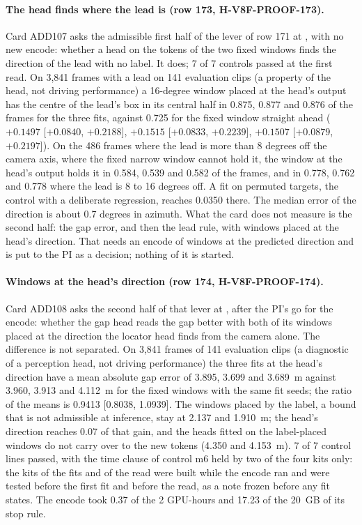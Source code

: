 \paragraph{The head finds where the lead is (row 173, H-V8F-PROOF-173).} Card ADD107 asks the admissible first half of the lever of row 171 at , with no new encode: whether a head on the tokens of the two fixed windows finds the direction of the lead with no label. It does; 7 of 7 controls passed at the first read. On 3,841 frames with a lead on 141 evaluation clips (a property of the head, not driving performance) a 16-degree window placed at the head's output has the centre of the lead's box in its central half in 0.875, 0.877 and 0.876 of the frames for the three fits, against 0.725 for the fixed window straight ahead ($+0.1497$ [$+0.0840$, $+0.2188$], $+0.1515$ [$+0.0833$, $+0.2239$], $+0.1507$ [$+0.0879$, $+0.2197$]). On the 486 frames where the lead is more than 8 degrees off the camera axis, where the fixed narrow window cannot hold it, the window at the head's output holds it in 0.584, 0.539 and 0.582 of the frames, and in 0.778, 0.762 and 0.778 where the lead is 8 to 16 degrees off. A fit on permuted targets, the control with a deliberate regression, reaches 0.0350 there. The median error of the direction is about 0.7 degrees in azimuth. What the card does not measure is the second half: the gap error, and then the lead rule, with windows placed at the head's direction. That needs an encode of windows at the predicted direction and is put to the PI as a decision; nothing of it is started.

\paragraph{Windows at the head's direction (row 174, H-V8F-PROOF-174).} Card ADD108 asks the second half of that lever at , after the PI's go for the encode: whether the gap head reads the gap better with both of its windows placed at the direction the locator head finds from the camera alone. The difference is not separated. On 3,841 frames of 141 evaluation clips (a diagnostic of a perception head, not driving performance) the three fits at the head's direction have a mean absolute gap error of 3.895, 3.699 and 3.689~m against 3.960, 3.913 and 4.112~m for the fixed windows with the same fit seeds; the ratio of the means is 0.9413 [0.8038, 1.0939]. The windows placed by the label, a bound that is not admissible at inference, stay at 2.137 and 1.910~m; the head's direction reaches 0.07 of that gain, and the heads fitted on the label-placed windows do not carry over to the new tokens (4.350 and 4.153~m). 7 of 7 control lines passed, with the time clause of control m6 held by two of the four kits only: the kits of the fits and of the read were built while the encode ran and were tested before the first fit and before the read, as a note frozen before any fit states. The encode took 0.37 of the 2 GPU-hours and 17.23 of the 20~GB of its stop rule.

